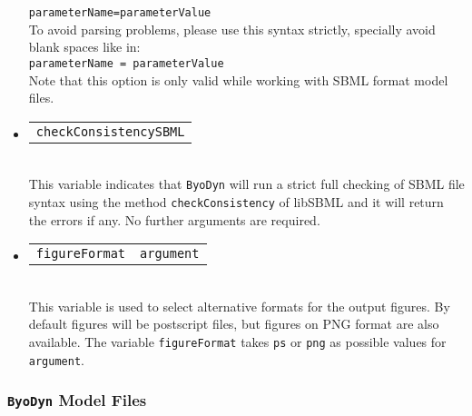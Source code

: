 \documentclass[a4paper, 11pt]{article}
\begin{document}
\begin{itemize}
  \texttt{parameterName=parameterValue}\\[1.5ex]
  To avoid parsing problems, please use this syntax strictly, specially avoid blank spaces like in:\\[1.5ex]
  \texttt{parameterName = parameterValue}\\[1.5ex]
  Note that this option is only valid while working with SBML format model files.
\item
  \begin{tabular}{c}
    \texttt{checkConsistencySBML}
  \end{tabular}\\[1.5ex]
  This variable indicates that \texttt{ByoDyn} will run a strict full checking of SBML file syntax using the method \texttt{checkConsistency} of libSBML and it will return the errors if any. 
  No further arguments are required.
\item
  \begin{tabular}{cc}
    \texttt{figureFormat}&\texttt{argument}\\
  \end{tabular}\\[1.5ex]
  This variable is used to select alternative formats for the output figures.
  By default figures will be postscript files, but figures on PNG format are also available.
  The variable \texttt{figureFormat} takes \texttt{ps} or \texttt{png} as possible values for \texttt{argument}.
\end{itemize}

\subsubsection{\texttt{ByoDyn} Model Files}
\end{document}
